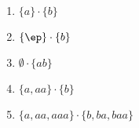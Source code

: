   \begin{enumerate}
  \item $\{a\} \cdot \{b\}$
  \item $\{\ep\} \cdot \{b\}$
  \item $\emptyset \cdot \{ab\}$
  \item $\{a, aa\} \cdot \{b\}$
  \item $\{a, aa, aaa\} \cdot \{b, ba, baa\}$
  \end{enumerate}
